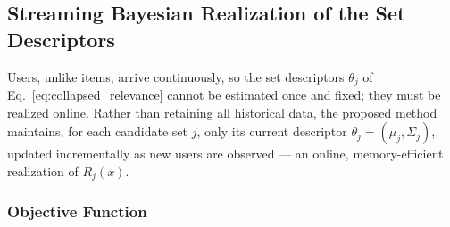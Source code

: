 \documentclass{article}
\theoremstyle{plain}
\theoremstyle{definition}
\theoremstyle{remark}
\begin{document}
\subsection{Streaming Bayesian Realization of the Set Descriptors}
\label{subsec:user_clustering}

Users, unlike items, arrive continuously, so the set descriptors $\theta_j$ of Eq.~\eqref{eq:collapsed_relevance} cannot be estimated once and fixed; they must be realized online. Rather than retaining all historical data, the proposed method maintains, for each candidate set $j$, only its current descriptor $\theta_j = (\mu_j, \Sigma_j)$, updated incrementally as new users are observed — an online, memory-efficient realization of $R_j(x)$.

\subsubsection{Objective Function}
\end{document}
